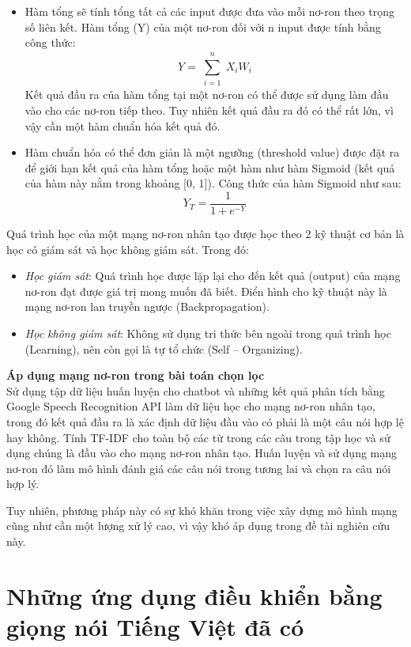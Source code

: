\documentclass[12pt]{report}
\begin{document}
\begin{itemize}
	\item Hàm tổng sẽ tính tổng tất cả các input được đưa vào mỗi nơ-ron theo trọng số liên kết. Hàm tổng (Y) của một nơ-ron đối với n input được tính bằng công thức:
	\[Y = \sum_{\substack{i=1}}^{\substack{n}}{X_iW_i}\]
	Kết quả đầu ra của hàm tổng tại một nơ-ron có thể được sử dụng làm đầu vào cho các nơ-ron tiếp theo. Tuy nhiên kết quả đầu ra đó có thể rất lớn, vì vậy cần một hàm chuẩn hóa kết quả đó.
	\item Hàm chuẩn hóa có thể đơn giản là một ngưỡng (threshold value) được đặt ra để giới hạn kết quả của hàm tổng hoặc một hàm như hàm Sigmoid (kết quả của hàm này nằm trong khoảng [0, 1]). Công thức của hàm Sigmoid như sau:
	\[Y_T = \frac{1}{1 + e^{-Y}}\]
\end{itemize}

Quá trình học của một mạng nơ-ron nhân tạo được học theo 2 kỹ thuật cơ bản là học có giám sát và học không giám sát. Trong đó:

\begin{itemize}
	\item \textit{Học giám sát}: Quá trình học được lặp lại cho đến kết quả (output) của mạng nơ-ron đạt được giá trị mong muốn đã biết. Điển hình cho kỹ thuật này là mạng nơ-ron lan truyền ngược (Backpropagation).
 	\item \textit{Học không giám sát}: Không sử dụng tri thức bên ngoài trong quá trình học (Learning), nên còn gọi là tự tổ chức (Self – Organizing).
\end{itemize}
\textbf{Áp dụng mạng nơ-ron trong bài toán chọn lọc\\[0.3cm]}
Sử dụng tập dữ liệu huấn luyện cho chatbot và những kết quả phân tích bằng Google Speech Recognition API làm dữ liệu học cho mạng nơ-ron nhân tạo, trong đó kết quả đầu ra là xác định dữ liệu đầu vào có phải là một câu nói hợp lệ hay không. Tính TF-IDF cho toàn bộ các từ trong các câu trong tập học và sử dụng chúng là đầu vào cho mạng nơ-ron nhân tạo. Huấn luyện và sử dụng mạng nơ-ron đó làm mô hình đánh giá các câu nói trong tương lai và chọn ra câu nói hợp lý.

Tuy nhiên, phương pháp này có sự khó khăn trong việc xây dựng mô hình mạng cũng như cần một lượng xử lý cao, vì vậy khó áp dụng trong đề tài nghiên cứu này.
\section{Những ứng dụng điều khiển bằng giọng nói Tiếng Việt đã có}
\end{document}
